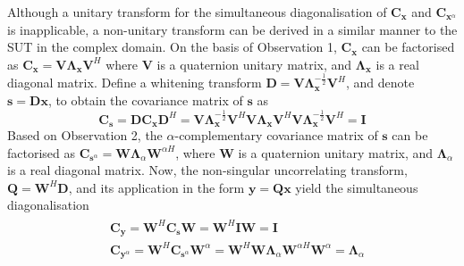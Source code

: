 \documentclass[review]{elsarticle}
\theoremstyle{plain}
\theoremstyle{remark}
\theoremstyle{plain}
\theoremstyle{definition}
\theoremstyle{prop}
\theoremstyle{definition}
\theoremstyle{plain}
\theoremstyle{plain}
\def \s {\mathbf{s}}
\begin{document}
Although a unitary transform for the simultaneous diagonalisation of $\mathbf{C}_\mathbf{x}$ and $\mathbf{C}_{\mathbf{x}^{\alpha}}$ is inapplicable, a non-unitary transform can be derived in a similar manner to the SUT in the complex domain. On the basis of Observation 1, $\mathbf{C}_\mathbf{x}$ can be factorised as
$
\mathbf{C}_\mathbf{x}=\mathbf{V}\mathbf{\Lambda}_\mathbf{x}\mathbf{V}^H
$
where $\mathbf{V}$ is a quaternion unitary matrix, and $\mathbf{\Lambda}_\mathbf{x}$ is a real diagonal matrix. Define a whitening transform $\mathbf{D}=\mathbf{V}\mathbf{\Lambda}_\mathbf{x}^{-\frac{1}{2}}\mathbf{V}^H$, and denote $\mathbf{s}=\mathbf{Dx}$, to obtain the covariance matrix of $\s$ as
\begin{equation*}
\mathbf{C}_\mathbf{s}=\mathbf{D}\mathbf{C}_\mathbf{x}\mathbf{D}^H=\mathbf{V}\mathbf{\Lambda}_\mathbf{x}^{-\frac{1}{2}}\mathbf{V}^H\mathbf{V}\mathbf{\Lambda}_\mathbf{x}\mathbf{V}^H\mathbf{V}\mathbf{\Lambda}_\mathbf{x}^{-\frac{1}{2}}\mathbf{V}^H=\mathbf{I}
\end{equation*}
Based on Observation 2, the $\alpha$-complementary covariance matrix of $\s$ can be factorised as $\mathbf{C}_{\mathbf{s}^\alpha}=\mathbf{W}\mathbf{\Lambda}_{\alpha}\mathbf{W}^{\alpha H}$,
where $\mathbf{W}$ is a quaternion unitary matrix, and $\mathbf{\Lambda}_{\alpha}$ is a real diagonal matrix. Now, the non-singular uncorrelating transform, $\mathbf{Q}=\mathbf{W}^H\mathbf{D}$, and its application in the form $\mathbf{y}=\mathbf{Qx}$ yield the simultaneous diagonalisation
\begin{align*}
\begin{split}
&\mathbf{C}_\mathbf{y}=\mathbf{W}^H\mathbf{C}_\mathbf{s}\mathbf{W}=
\mathbf{W}^H\mathbf{I}\mathbf{W}=\mathbf{I} \\
&\mathbf{C}_{\mathbf{y}^\alpha}\!=\!\!\mathbf{W}^H\mathbf{C}_{\mathbf{s}^\alpha}\mathbf{W}^\alpha
\!=\!\mathbf{W}^H\!\mathbf{W}\mathbf{\Lambda}_{\alpha}\mathbf{W}^{\alpha H}\!\mathbf{W}^\alpha\!=\!\mathbf{\Lambda}_{\alpha}
\end{split}
\end{align*}
\end{document}
